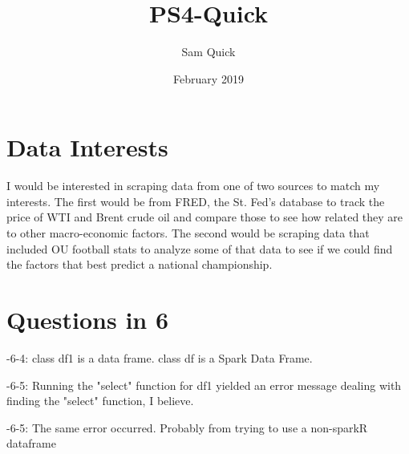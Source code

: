 \documentclass{article}
\title{PS4-Quick}
\author{Sam Quick}
\date{February 2019}
\begin{document}
\maketitle

\section{Data Interests}
I would be interested in scraping data from one of two sources to match my interests. The first would be from FRED, the St. Fed's database to track the price of WTI and Brent crude oil and compare those to see how related they are to other macro-economic factors. The second would be scraping data that included OU football stats to analyze some of that data to see if we could find the factors that best predict a national championship.

\section{Questions in 6}
-6-4: class df1 is a data frame.
      class df is a Spark Data Frame.

-6-5: Running the "select" function for df1 yielded an error message dealing with finding the  "select" function, I believe.

-6-5: The same error occurred. Probably from trying to use a non-sparkR dataframe
\end{document}

